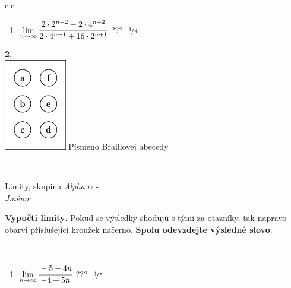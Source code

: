 \documentclass[10pt]{report}
\begin{document}
\begin{tabular}{c:c}
\begin{minipage}[c][104.5mm][t]{0.5\linewidth}
\begin{center}
\begin{minipage}{0.79\linewidth}
\begin{center}
\begin{varwidth}{\linewidth}
\begin{enumerate}
\item $\lim\limits_{n\to\infty}\cfrac{2\cdot 2^{n-2}-2\cdot 4^{n+2}}{2\cdot 4^{n-1}+16\cdot 2^{n+1}}$\quad \dotfill\; ???\;\dotfill \quad $\nicefrac{-1}{4}$
\end{enumerate}
\end{varwidth}
\end{center}
\end{minipage}
\begin{minipage}{0.20\linewidth}
\begin{center}
{\Huge\bfseries 2.} \\[2mm]
\includegraphics[height=40mm]{../images/braille.png}
{\small Písmeno Braillovej abecedy}
\end{center}
\end{minipage}
\end{center}
\end{minipage}
\\ \hdashline
\begin{minipage}[c][104.5mm][t]{0.5\linewidth}
\begin{center}
\vspace{7mm}
{\huge Limity, skupina \textit{Alpha $\alpha$} -}\\[5mm]
\textit{Jméno:}\phantom{xxxxxxxxxxxxxxxxxxxxxxxxxxxxxxxxxxxxxxxxxxxxxxxxxxxxxxxxxxxxxxxxx}\\[5mm]
\begin{minipage}{0.95\linewidth}
\begin{center}
\textbf{Vypočti limity}. Pokud se výsledky shodujú s tými za otazníky, tak napravo\\obarvi příslušející kroužek načerno. \textbf{Spolu odevzdejte výsledné slovo}.
\end{center}
\end{minipage}
\\[1mm]
\begin{minipage}{0.79\linewidth}
\begin{center}
\begin{varwidth}{\linewidth}
\begin{enumerate}
\normalsize
\item $\lim\limits_{n\to\infty}\cfrac{-5-4n}{-4+5n}$\quad \dotfill\; ???\;\dotfill \quad $\nicefrac{-4}{5}$

\end{enumerate}
\end{varwidth}
\end{center}
\end{minipage}
\end{center}
\end{minipage}
\end{tabular}
\end{document}
